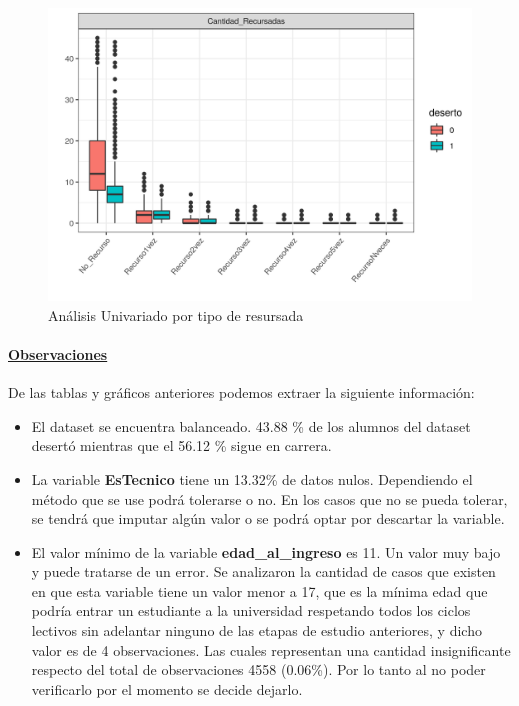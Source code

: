 \begin{figure}[!htb]
	\centering
	\includegraphics{imagenes/imagenes/gg_explo_tablon_tipo_recur.png}
	\caption{Análisis Univariado por tipo de resursada}
	\label{fig:tablon_boxplot_tipoRecursada}
\end{figure}

\clearpage

\hypertarget{observaciones}{%
	\paragraph{\textbf{\underline{Observaciones}}}\label{observaciones}}

De las tablas y gráficos anteriores podemos extraer la siguiente
información:

\begin{itemize}
	\item
	El dataset se encuentra balanceado. 43.88 \% de los alumnos del
	dataset desertó mientras que el 56.12 \% sigue en carrera.
	\item
	La variable \textbf{EsTecnico} tiene un 13.32\% de datos nulos.
	Dependiendo el método que se use podrá tolerarse o no. En los casos
	que no se pueda tolerar, se tendrá que imputar algún valor o se podrá
	optar por descartar la variable.
	\item
	El valor mínimo de la variable \textbf{edad\_al\_ingreso} es 11. Un
	valor muy bajo y puede tratarse de un error. Se analizaron la cantidad
	de casos que existen en que esta variable tiene un valor menor a 17,
	que es la mínima edad que podría entrar un estudiante a la universidad
	respetando todos los ciclos lectivos sin adelantar ninguno de las
	etapas de estudio anteriores, y dicho valor es de 4 observaciones. Las
	cuales representan una cantidad insignificante respecto del total de
	observaciones 4558 (0.06\%). Por lo tanto al no poder verificarlo por
	el momento se decide dejarlo.
\end{itemize}

